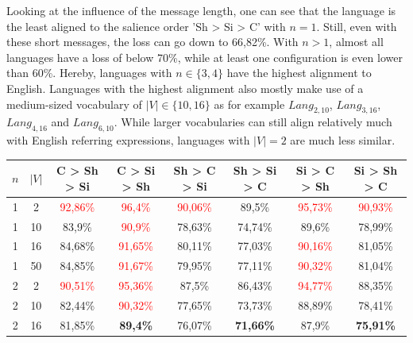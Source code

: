 Looking at the influence of the message length, one can see that the language is the least aligned to the salience order 'Sh > Si > C' with $n=1$.
Still, even with these short messages, the loss can go down to 66,82\%.
With $n>1$, almost all languages have a loss of below 70\%, while at least one configuration is even lower than 60\%.
Hereby, languages with $n \in \{3,4\}$ have the highest alignment to English.
Languages with the highest alignment also mostly make use of a medium-sized vocabulary of $|V| \in \{10,16\}$ as for example $Lang_{2,10}$, $Lang_{3,16}$, $Lang_{4,16}$ and $Lang_{6,10}$.
While larger vocabularies can still align relatively much with English referring expressions, languages with $|V|=2$ are much less similar.

\begin{table}[ht]
    \centering
    \begin{tabular}{cc|c|c|c|c|c|c}
        \toprule
        $n$ & $|V|$ & \textbf{C > Sh > Si}     & \textbf{C > Si > Sh}     & \textbf{Sh > C > Si}     & \textbf{Sh > Si > C} & \textbf{Si > C > Sh}     & \textbf{Si > Sh > C}     \\\midrule
        {1} & {2}   & \textcolor{red}{92,86\%} & \textcolor{red}{96,4\%}  & \textcolor{red}{90,06\%} & {89,5\%}             & \textcolor{red}{95,73\%} & \textcolor{red}{90,93\%} \\
        {1} & {10}  & {83,9\%}                 & \textcolor{red}{90,9\%}  & {78,63\%}                & {74,74\%}            & {89,6\%}                 & {78,99\%}                \\
        {1} & {16}  & {84,68\%}                & \textcolor{red}{91,65\%} & {80,11\%}                & {77,03\%}            & \textcolor{red}{90,16\%} & {81,05\%}                \\
        {1} & {50}  & {84,85\%}                & \textcolor{red}{91,67\%} & {79,95\%}                & {77,11\%}            & \textcolor{red}{90,32\%} & {81,04\%}                \\
        {2} & {2}   & \textcolor{red}{90,51\%} & \textcolor{red}{95,36\%} & {87,5\%}                 & {86,43\%}            & \textcolor{red}{94,77\%} & {88,35\%}                \\
        {2} & {10}  & {82,44\%}                & \textcolor{red}{90,32\%} & {77,65\%}                & {73,73\%}            & {88,89\%}                & {78,41\%}                \\
        {2} & {16}  & {81,85\%}                & \textbf{89,4\%}          & {76,07\%}                & \textbf{71,66\%}     & {87,9\%}                 & \textbf{75,91\%}         \\

\end{tabular}
\end{table}
